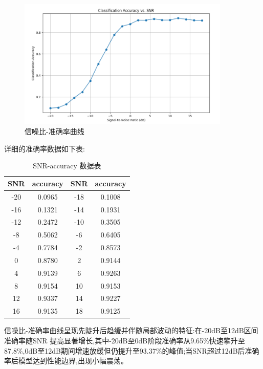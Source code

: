 \documentclass{article}
\begin{document}
\begin{CJK}{UTF8}{gbsn}
\begin{figure}[H]
    \centering
    \includegraphics[width=0.9\textwidth]{figure/image13.png}
    \caption{信噪比-准确率曲线}
    \label{fig:snr_accuracy_curve}
\end{figure}

详细的准确率数据如下表:

\begin{table}[H]
    \centering
    \caption{SNR-accuracy 数据表}
    \begin{tabular}{|c|c|c|c|}
        \hline
        \textbf{SNR} & \textbf{accuracy} & \textbf{SNR} & \textbf{accuracy} \\
        \hline
        -20 & 0.0965 & -18 & 0.1008 \\
        \hline
        -16 & 0.1321 & -14 & 0.1931 \\
        \hline
        -12 & 0.2472 & -10 & 0.3505 \\
        \hline
        -8 & 0.5062 & -6 & 0.6405 \\
        \hline
        -4 & 0.7784 & -2 & 0.8573 \\
        \hline
        0 & 0.8780 & 2 & 0.9144 \\
        \hline
        4 & 0.9139 & 6 & 0.9263 \\
        \hline
        8 & 0.9154 & 10 & 0.9153 \\
        \hline
        12 & 0.9337 & 14 & 0.9227 \\
        \hline
        16 & 0.9135 & 18 & 0.9125 \\
        \hline
    \end{tabular}
    \label{tab:snr_accuracy_data}
\end{table}

信噪比-准确率曲线呈现先陡升后趋缓并伴随局部波动的特征:在-20dB至12dB区间准确率随SNR 提高显著增长,其中-20dB至0dB阶段准确率从9.65\%快速攀升至87.8\%,0dB至12dB期间增速放缓但仍提升至93.37\%的峰值;当SNR超过12dB后准确率后模型达到性能边界,出现小幅震荡。


\end{CJK}
\end{document}

